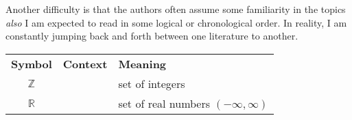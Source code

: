 Another difficulty is that  the authors often assume some familiarity in the topics
\textit{also} I am expected to read in some logical or chronological order.
In reality, I am constantly jumping back and forth between one literature to another.

\begin{table}[h!]
    \centering\renewcommand{\arraystretch}{1.2}
    \begin{tabular}{ccl}
        \textbf{Symbol} & \textbf{Context} & \textbf{Meaning}                       \\
        $\mathbb{Z}$    &                  & set of integers                        \\
        $\mathbb{R}$    &                  & set of real numbers $(-\infty,\infty)$ \\
    \end{tabular}
    \label{tab:real-notation}
\end{table}